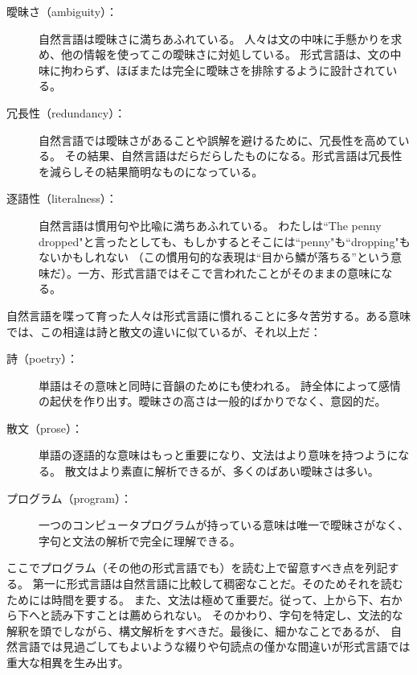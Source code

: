 \documentclass[a4j,12pt,makeidx]{jbook}
\begin{document}
\begin{description}
\item [曖昧さ（ambiguity）：] 自然言語は曖昧さに満ちあふれている。
人々は文の中味に手懸かりを求め、他の情報を使ってこの曖昧さに対処している。
形式言語は、文の中味に拘わらず、ほぼまたは完全に曖昧さを排除するように設計されている。
\item [冗長性（redundancy）：] 自然言語では曖昧さがあることや誤解を避けるために、冗長性を高めている。
その結果、自然言語はだらだらしたものになる。形式言語は冗長性を減らしその結果簡明なものになっている。
\item [逐語性（literalness）：] 自然言語は慣用句や比喩に満ちあふれている。
わたしは``The penny dropped"と言ったとしても、もしかするとそこには``penny"も``dropping"もないかもしれない
（この慣用句的な表現は“目から鱗が落ちる”という意味だ）。一方、形式言語ではそこで言われたことがそのままの意味になる。
\end{description}
自然言語を喋って育った人々は形式言語に慣れることに多々苦労する。ある意味では、この相違は詩と散文の違いに似ているが、それ以上だ：
\begin{description}
\item [詩（poetry）：] 単語はその意味と同時に音韻のためにも使われる。
詩全体によって感情の起伏を作り出す。曖昧さの高さは一般的ばかりでなく、意図的だ。
\item [散文（prose）：] 単語の逐語的な意味はもっと重要になり、文法はより意味を持つようになる。
散文はより素直に解析できるが、多くのばあい曖昧さは多い。
\item [プログラム（program）：] 一つのコンピュータプログラムが持っている意味は唯一で曖昧さがなく、字句と文法の解析で完全に理解できる。
\end{description}
ここでプログラム（その他の形式言語でも）を読む上で留意すべき点を列記する。
第一に形式言語は自然言語に比較して稠密なことだ。そのためそれを読むためには時間を要する。
また、文法は極めて重要だ。従って、上から下、右から下へと読み下すことは薦められない。
そのかわり、字句を特定し、文法的な解釈を頭でしながら、構文解析をすべきだ。最後に、細かなことであるが、
自然言語では見過ごしてもよいような綴りや句読点の僅かな間違いが形式言語では重大な相異を生み出す。
%
\end{document}

